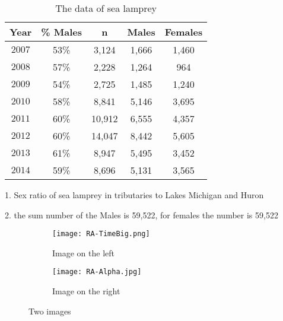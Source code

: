\documentclass[12pt]{article}  %
\begin{document}
\begin{table}[!htbp]
	\begin{center}
		\begin{threeparttable}
		\caption{The data of sea lamprey}
		\begin{tabular}{ccccc}
			\toprule
			\multicolumn{1}{m{2cm}}{\centering Year}
			&\multicolumn{1}{m{2cm}}{\centering \% Males}
			&\multicolumn{1}{m{2cm}}{\centering n}
			&\multicolumn{1}{m{2cm}}{\centering Males}
			&\multicolumn{1}{m{2cm}}{\centering Females}\\
			\midrule
			$2007$&53\%&3,124&1,666&1,460\\
			$2008$&57\%&2,228&1,264&964\\
			$2009$&54\%&2,725&1,485&1,240\\
			$2010$ &58\%&8,841&5,146&3,695\\
			$2011$ &60\%&10,912&6,555&4,357\\
			$2012$ &60\%&14,047&8,442&5,605\\
			$2013$ &61\%&8,947&5,495&3,452\\
			$2014$ &59\%&8,696&5,131&3,565\\
			\bottomrule
		\end{tabular}\label{tb:002}
		\small
		1. Sex ratio of sea lamprey in tributaries to Lakes Michigan and Huron\cite{3}
		
		2. the sum number of the Males is 59,522, for females the number is 59,522 
		\end{threeparttable}
	\end{center}

\end{table}










\begin{figure}[htbp]
	\centering
	\begin{subfigure}[b]{.45\textwidth}
		\texttt{[image: RA-TimeBig.png]}
		\caption{Image on the left}\label{subfig:left}
	\end{subfigure}
	\begin{subfigure}[b]{.45\textwidth}
		\texttt{[image: RA-Alpha.jpg]}
		\caption{Image on the right}\label{subfig:right}
	\end{subfigure}
	\caption{Two images}\label{fig:subfigures}
\end{figure}
\end{document}
